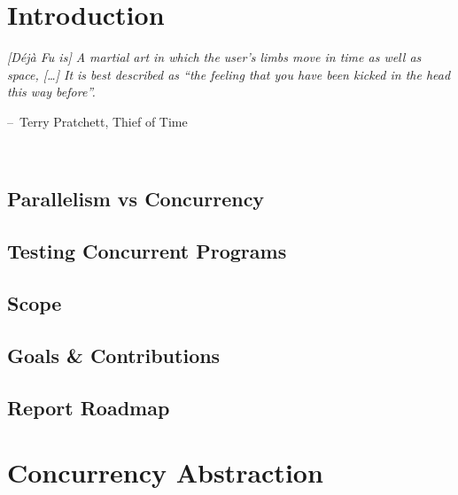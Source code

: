 \documentclass[openright, dottedtoc, headinclude, footinclude=true, a4paper, numbers=noenddot, fontsize=10pt]{scrreprt}
\makeatletter
\newcommand{\mainmatter}{\cleardoublepage\pagenumbering{arabic}}
\newenvironment{chapquote}[2][2em]
  {\setlength{\@tempdima}{#1}%
   \def\chapquote@author{#2}%
   \parshape 1 \@tempdima \dimexpr\textwidth-2\@tempdima\relax%
   \itshape}
  {\par\normalfont\hfill--\
    \chapquote@author\hspace*{\@tempdima}\par\noindent\hrulefill\\[1cm]}
\newcommand{\dejafu}{D\'{e}j\`{a} Fu}
\makeatother
\begin{document}
\tableofcontents


\mainmatter

\section{Introduction}
\label{chap:intro}
\begin{chapquote}{Terry Pratchett, Thief of Time\nocite{pratchett2001}}
  [\dejafu{} is] A martial art in which the user's limbs move in time
  as well as space, [\ldots] It is best described as ``the feeling
  that you have been kicked in the head this way before''.
\end{chapquote}



  \subsection{Parallelism vs Concurrency}
  \label{sec:intro-parconc}
  

  \subsection{Testing Concurrent Programs}
  \label{sec:intro-testing}
  

  \subsection{Scope}
  \label{sec:intro-scope}
  

  \subsection{Goals \& Contributions}
  \label{sec:intro-contribs}
  

  \subsection{Report Roadmap}
  \label{sec:intro-roadmap}
  

\section{Concurrency Abstraction}
\label{chap:abstraction}

\end{document}
